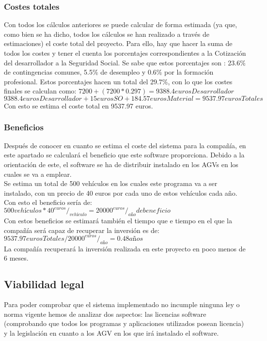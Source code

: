 \subsubsection{Costes totales}
Con todos los cálculos anteriores se puede calcular de forma estimada (ya que, como bien se ha dicho, todos los cálculos se han realizado a través de estimaciones) el coste total del proyecto. Para ello, hay que hacer la suma de todos los costes y tener el cuenta los porcentajes correspondientes a la Cotización del desarrollador a la Seguridad Social. Se sabe que estos porcentajes son : 23.6\% de contingencias comunes, 5.5\% de desempleo y 0.6\% por la formación profesional. Estos porcentajes hacen un total del 29.7\%, con lo que los costes finales se calculan como:
$7200 + (7200 * 0.297) = 9388.4 eurosDesarrollador$\\
$9388.4 eurosDesarrollador + 15 eurosSO + 184.57  eurosMaterial = 9537.97 eurosTotales$ \\
Con esto se estima el coste total en 9537.97 euros.\\

\subsubsection{Beneficios}
Después de conocer en cuanto se estima el coste del sistema para la compañía, en este apartado se calculará el beneficio que este software proporciona. Debido a la orientación de este, el software se ha de distribuir instalado en los AGVs en los cuales se va a emplear.\\
Se estima un total de 500 vehículos en los cuales este programa va a ser instalado, con un precio de 40 euros por cada uno de estos vehículos cada año. Con esto el beneficio sería de:\\
$500 vehículos * 40 ^{euros}/_{vehículo} = 20000 ^{euros}/_{año} de beneficio $\\
Con estos beneficios se estimará también el tiempo que e tiempo en el que la compañía será capaz de recuperar la inversión es de:
$9537.97 eurosTotales /  20000 ^{euros}/_{año}= 0.48 años$\\
La compañía recuperará la inversión realizada en este proyecto en poco menos de 6 meses.\\

\subsection{Viabilidad legal}
Para poder comprobar que el sistema implementado no incumple ninguna ley o norma vigente hemos de analizar dos aspectos: las licencias software (comprobando que todos los programas y aplicaciones utilizados posean licencia) y la legislación en cuanto a los AGV en los que irá instalado el software.\\

